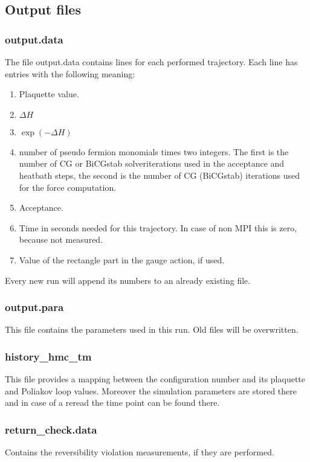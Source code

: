 \subsection{Output files}

\subsubsection*{\ttfamily output.data}

The file {\ttfamily output.data} contains lines for each performed
trajectory. Each line has entries with the following meaning:
\begin{enumerate}
\item Plaquette value.
\item $\Delta H$
\item $\exp(-\Delta H)$
\item number of pseudo fermion monomials times two integers. The first
  is the number of CG or BiCGstab solveriterations used in the acceptance
  and heatbath steps, the second is the number of CG (BiCGstab) iterations 
  used for the force computation.
\item Acceptance.
\item Time in seconds needed for this trajectory. In case of non MPI
  this is zero, because not measured.
\item Value of the rectangle part in the gauge action, if used.
\end{enumerate}
Every new run will append its numbers to an already existing file.

\subsubsection*{\ttfamily output.para}
This file contains the parameters used in this run. Old files will be
overwritten. 

\subsubsection*{\ttfamily history\_hmc\_tm}
This file provides a mapping between the configuration number and its
plaquette and Poliakov loop values. Moreover the simulation parameters
are stored there and in case of a reread the time point can be found there. 

\subsubsection*{\ttfamily return\_check.data}
Contains the reversibility violation measurements, if they are
performed. 

